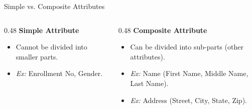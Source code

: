 \documentclass[aspectratio=169, xcolor=dvipsnames]{beamer}
\begin{document}
\begin{frame}{Simple vs. Composite Attributes}
    \begin{columns}[t]
        \begin{column}{0.48\textwidth}
            \textbf{Simple Attribute}
            \begin{itemize}
                \item Cannot be divided into smaller parts.
                \item \textit{Ex:} Enrollment No, Gender.
            \end{itemize}
        \end{column}
        
        \begin{column}{0.48\textwidth}
            \textbf{Composite Attribute}
            \begin{itemize}
                \item Can be divided into sub-parts (other attributes).
                \item \textit{Ex:} Name (First Name, Middle Name, Last Name).
                \item \textit{Ex:} Address (Street, City, State, Zip).
            \end{itemize}
        \end{column}
    \end{columns}
    
    \vspace{1em}
    \centering
\end{frame}
\end{document}
